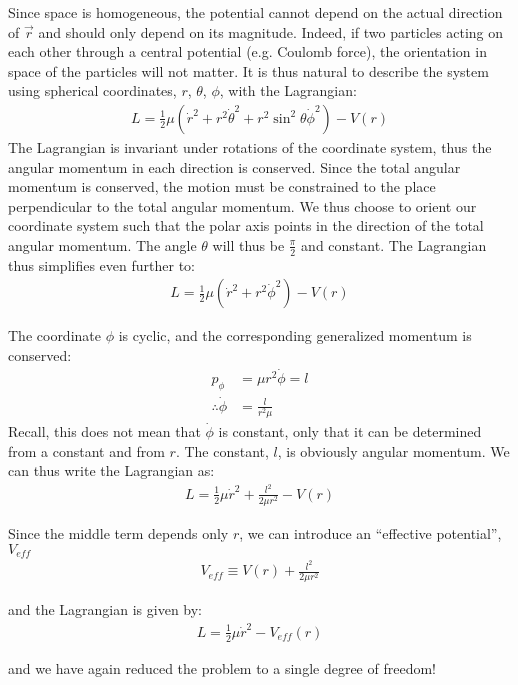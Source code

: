 Since space is homogeneous, the potential cannot depend on the actual direction of $\vec{r}$ and should only depend on its magnitude. Indeed, if two particles acting on each other through a central potential (e.g. Coulomb force), the orientation in space of the particles will not matter. It is thus natural to describe the system using spherical coordinates, $r$, $\theta$, $\phi$, with the Lagrangian:
\begin{align}
L=\frac{1}{2}\mu(\dot{r}^2+r^2\dot{\theta}^2+r^2\sin^2\theta\dot{\phi}^2)-V(r)
\end{align}
The Lagrangian is invariant under rotations of the coordinate system, thus the angular momentum in each direction is conserved. Since the total angular momentum is conserved, the motion must be constrained to the place perpendicular to the total angular momentum. We thus choose to orient our coordinate system such that the polar axis points in the direction of the total angular momentum. The angle $\theta$ will thus be $\frac{\pi}{2}$ and constant. The Lagrangian thus simplifies even further to:
\begin{align}
L=\frac{1}{2}\mu(\dot{r}^2+r^2\dot{\phi}^2)-V(r)
\end{align}

The coordinate $\phi$ is cyclic, and the corresponding generalized momentum is conserved:
\begin{align}
p_\phi&=\mu r^2\dot\phi=l\nonumber\\
\therefore \dot\phi&=\frac{l}{r^2\mu}
\end{align}
Recall, this does not mean that $\dot\phi$ is constant, only that it can be determined from a constant and from $r$. The constant, $l$, is obviously angular momentum. We can thus write the Lagrangian as:
\begin{align}
L=\frac{1}{2}\mu\dot{r}^2+\frac{l^2}{2\mu r^2}-V(r)
\end{align}
 
Since the middle term depends only $r$, we can introduce an ``effective potential'', $V_{eff}$
\begin{align}
V_{eff}\equiv V(r)+\frac{l^2}{2\mu r^2}
\end{align}

and the Lagrangian is given by:
\begin{align}
L=\frac{1}{2}\mu\dot{r}^2-V_{eff}(r)
\end{align}

and we have again reduced the problem to a single degree of freedom!

